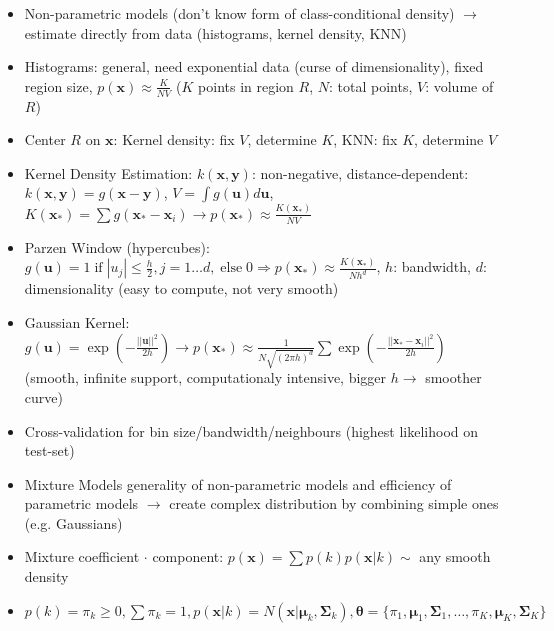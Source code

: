 \documentclass[11pt]{scrartcl}
\begin{document}
\begin{itemize}
    \item Non-parametric models (don't know form of class-conditional density) \( \rightarrow \) 
        estimate directly from data (histograms, kernel density, KNN)
    \item Histograms: general, need exponential data (curse of dimensionality), fixed region 
        size, \( p ( \bm{x} ) \approx \frac{K}{N V} \) (\( K \) points in region \( R \), 
        \( N \): total points, \( V \): volume of \( R \))
    \item Center \( R \) on \( \bm{x} \): Kernel density: fix \( V \), determine \( K \), KNN: 
        fix \( K \), determine \( V \)
    \item Kernel Density Estimation: \( k ( \bm{x}, \bm{y} ) \): non-negative, 
        distance-dependent: \( k ( \bm{x}, \bm{y} ) = g ( \bm{x} - \bm{y} ) \), 
        \( V = \int g ( \bm{u} ) d \bm{u} \), \( K ( \bm{x}_* ) = 
        \sum g ( \bm{x}_* - \bm{x}_i )  \rightarrow p ( \bm{x}_* ) \approx 
        \frac{K ( \bm{x}_* )}{N V} \)
    \item Parzen Window (hypercubes): \( g ( \bm{u} ) = 1 \; \mathrm{if} \; 
        | u_j | \leq \frac{h}{2}, j = 1 \dots d, \; \mathrm{else} \; 
        0 \Rightarrow p ( \bm{x}_* ) \approx \frac{K ( \bm{x}_* )}{N h^d} \), \( h \): 
        bandwidth, \( d \): dimensionality (easy to compute, not very smooth)
    \item Gaussian Kernel: \( g ( \bm{u} ) = \exp ( - \frac{|| \bm{u} ||^2}{2 h}) \rightarrow 
        p ( \bm{x}_* ) \approx \frac{1}{N \sqrt{( 2 \pi h )^d}} 
        \sum \exp ( - \frac{|| \bm{x}_* - \bm{x}_i ||^2}{2 h} ) \) (smooth, infinite support, 
        computationaly intensive, bigger \( h \rightarrow \) smoother curve)
    \item Cross-validation for bin size/bandwidth/neighbours (highest likelihood on test-set)
    \item Mixture Models generality of non-parametric models and efficiency of parametric 
        models \( \rightarrow \) create complex distribution by combining simple ones (e.g. 
        Gaussians)
    \item Mixture coefficient \( \cdot \) component: \( p ( \bm{x} ) = 
        \sum p ( k ) p ( \bm{x} | k ) \sim \) any smooth density
    \item \( p ( k ) = \pi_k \geq 0, \sum \pi_k = 1, p ( \bm{x} | k ) = 
        N ( \bm{x} | \bm{\mu}_k, \bm{\Sigma}_k ), \bm{\theta} = 
        \{ \pi_1, \bm{\mu}_1, \bm{\Sigma}_1, \dots, \pi_K, \bm{\mu}_K, \bm{\Sigma}_K \} \)

\end{itemize}
\end{document}
